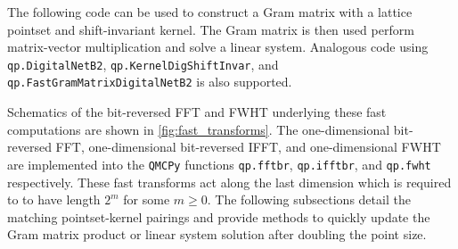 \documentclass[acmsmall]{acmart}
\begin{document}
The following code can be used to construct a Gram matrix with a lattice pointset and shift-invariant kernel. The Gram matrix is then used perform matrix-vector multiplication and solve a linear system. Analogous code using \texttt{qp.DigitalNetB2}, \texttt{qp.KernelDigShiftInvar}, and \texttt{qp.FastGramMatrixDigitalNetB2} is also supported. 



Schematics of the bit-reversed FFT and FWHT underlying these fast computations are shown in \cref{fig:fast_transforms}. The one-dimensional bit-reversed FFT, one-dimensional bit-reversed IFFT, and one-dimensional FWHT are implemented into the \texttt{QMCPy} functions \texttt{qp.fftbr}, \texttt{qp.ifftbr}, and \texttt{qp.fwht} respectively. These fast transforms act along the last dimension which is required to to have length $2^m$ for some $m \geq 0$.  The following subsections detail the matching pointset-kernel pairings and provide methods to quickly update the Gram matrix product or linear system solution after doubling the point size.
\end{document}

